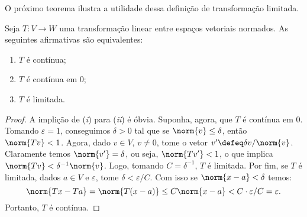 O próximo teorema ilustra a utilidade dessa definição de transformação limitada.

\begin{teo}
    Seja \( T : V \to W \) uma transformação linear entre espaços vetoriais normados.
    As seguintes afirmativas são equivalentes:
    \begin{enumerate}[label=(\roman*)]
        \item \( T \) é contínua;
        \item \( T \) é contínua em \( 0 \);
        \item \( T \) é limitada.
    \end{enumerate}
\end{teo}
\begin{proof}
    A implição de (\emph{i}) para (\emph{ii}) é óbvia.
    Suponha, agora, que \( T \) é contínua em \( 0 \).
    Tomando \( \varepsilon = 1 \), conseguimos \( \delta > 0 \) tal que se \( \norm{ v } \leq \delta \), então \( \norm{ Tv } < 1 \).
    Agora, dado \( v \in V \), \( v \neq 0 \), tome o vetor \( v' \defeq \delta v / \norm{ v } \).
    Claramente temos \( \norm{ v' } = \delta \), ou seja, \( \norm{ Tv' } < 1 \), o que implica \( \norm{ Tv } < \delta^{ -1 } \norm{ v } \).
    Logo, tomando \( C = \delta^{ -1 } \), \( T \) é limitada.
    Por fim, se \( T \) é limitada, dados \( a \in V \) e \( \varepsilon \), tome \( \delta < \varepsilon/C \).
    Com isso se \( \norm{ x - a } < \delta \) temos: \[
        \norm{ Tx - Ta } = \norm{ T(x - a) } \leq C \norm{ x - a } < C \cdot \varepsilon/C = \varepsilon
    .\]
    Portanto, \( T \) é contínua.
\end{proof}

